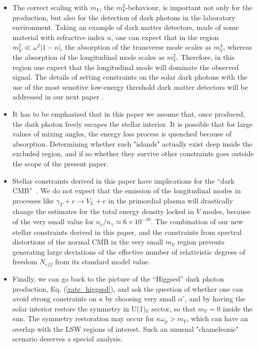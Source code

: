 \documentclass[12pt]{article}
\begin{document}
\begin{itemize} 
\item The correct scaling with $m_V$, the $m_V^2$-behaviour, is
  important not only for the production, but also for the detection of
  dark photons in the laboratory environment.  Taking an example of
  dark matter detectors, made of some material with refractive index
  $n$, one can expect that in the region $m_V^2 \ll \omega^2 |1 - n|$,
  the absorption of the transverse mode scales as $m_V^4$, whereas the
  absorption of the longitudinal mode scales as $m_V^2$. Therefore, in
  this region one expect that the longitudinal mode will dominate the
  observed signal. The details of setting constraints on the solar
  dark photons with the use of the most sensitive low-energy threshold
  dark matter detectors will be addressed in our next paper
  \cite{ournextpaper}.

\item It has to be emphasized that in this paper we assume that, once
  produced, the dark photon freely escapes the stellar interior. It is
  possible that for large values of mixing angles, the energy loss
  process is quenched because of absorption. Determining whether
  such "islands" actually exist deep inside the excluded region, and
  if so whether they survive other constraints goes outside the scope
  of the present paper.

\item Stellar constraints derived in this paper have implications for
  the ``dark CMB''~\cite{Jaeckel:2008fi}.  We do not expect that the
  emission of the longitudinal modes in processes like $\gamma_T + e
  \to V_L + e$ in the primordial plasma will drastically change the
  estimates for the total energy density locked in $V$ modes, because
  of the very small value for $n_e/n_\gamma \simeq 6\times 10^{-10}$.
  The combination of our new stellar constraints derived in this
  paper, and the constraints from spectral distortions of the normal
  CMB in the very small $m_V$ region prevents generating large
  deviations of the effective number of relativistic degrees of
  freedom $N_{eff}$ from its standard model value.


\item Finally, we can go back to the picture of the ``Higgsed'' dark
  photon production, Eq. (\ref{rate_higgsed}), and ask the question of
  whether one can avoid strong constraints on $\kappa$ by choosing
  very small $\alpha'$, and by having the solar interior restore the
  symmetry in U(1)$_V$ sector, so that $m_V =0$ inside the sun. The
  symmetry restoration may occur for $\kappa \omega_p > m_V$, which
  can have an overlap with the LSW regions of interest. Such an
  unusual "chameleonic" scenario deserves a special analysis.


\end{itemize} 
\end{document}
